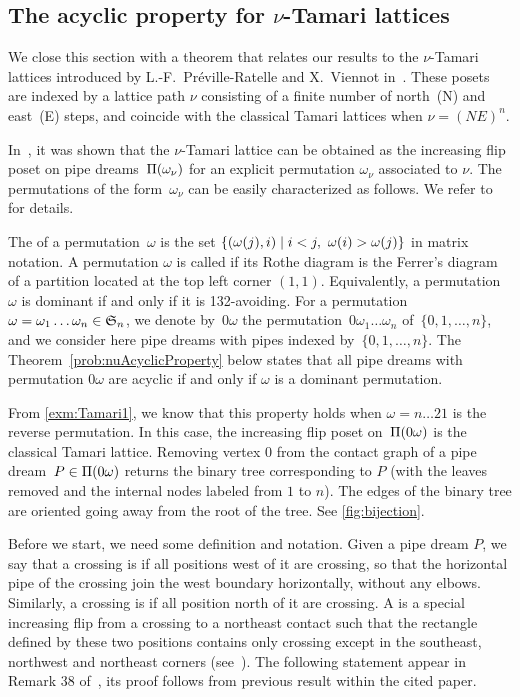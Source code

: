 \subsection{The acyclic property for $\nu$-Tamari lattices} 
\label{subsec:nuTamari} 

We close this section with a theorem that relates our results to the $\nu$-Tamari lattices introduced by L.-F.~Préville-Ratelle and X.~Viennot in~\cite{PrevilleRatelleViennot}. These posets are indexed by a lattice path $\nu$ consisting of a finite number of north~(N) and east~(E) steps, and coincide with the classical Tamari lattices when $\nu=(NE)^n$.

In~\cite{CeballosPadrolSarmiento}, it was shown that the $\nu$-Tamari lattice can be obtained as the increasing flip poset on pipe dreams~$\Pi(\omega_\nu)$ for an explicit permutation $\omega_\nu$ associated to $\nu$. The permutations of the form~$\omega_\nu$ can be easily characterized as follows. We refer to~\cite{CeballosPadrolSarmiento} for details. 

The  of a permutation~$\omega$ is the set $\set{(\omega(j),i)}{i<j,\ \omega(i)>\omega(j)}$ in matrix notation.
A permutation $\omega$ is called  if its Rothe diagram is the Ferrer's diagram of a partition located at the top left corner $(1,1)$. Equivalently, a permutation~$\omega$ is dominant if and only if it is 132-avoiding. 
For a permutation~$\omega = \omega_1 \dots \omega_n \in \mathfrak{S}_n$, we denote by~$0\omega$ the permutation~$0 \omega_1 \dots \omega_n$ of~$\{0, 1, \dots, n\}$, and we consider here pipe dreams with pipes indexed by~$\{0, 1, \dots, n\}$. The Theorem~\ref{prob:nuAcyclicProperty} below states that all pipe dreams with permutation $0 \omega$ are acyclic if and only if $\omega$ is a dominant permutation.


From \cref{exm:Tamari1}, we know that this property holds when $\omega=n\dots21$ is the reverse permutation. 
In this case, the increasing flip poset on~$\Pi(0 \omega)$ is the classical Tamari lattice. Removing vertex $0$ from the contact graph of a pipe dream~$ P\in \Pi(0 \omega)$ returns the binary tree corresponding to $P$ (with the leaves removed and the internal nodes labeled from $1$ to $n$).
The edges of the binary tree are oriented going away from the root of the tree.  
See \cref{fig:bijection}.

Before we start, we need some definition and notation. Given a pipe dream $P$, we say that a crossing is  if all positions west of it are crossing,
so that the horizontal pipe of the crossing join the west boundary horizontally, without any elbows. Similarly, a crossing is   if all position north of it are crossing. A 
is a special increasing flip from a crossing to a northeast contact such that the rectangle defined by these two positions contains only crossing
except in the southeast, northwest and northeast corners (see~\cite[Figure 13]{CeballosPadrolSarmiento}). The following statement appear
in Remark 38 of~\cite{CeballosPadrolSarmiento}, its proof follows from previous result within the cited paper.


